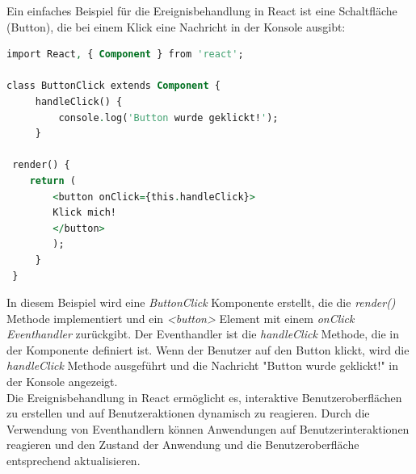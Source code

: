 Ein einfaches Beispiel für die Ereignisbehandlung in React ist eine Schaltfläche (Button), die bei einem Klick eine Nachricht in der Konsole ausgibt:

\begin{lstlisting}[language=vhdl,
	frame=single,           % Ein Rahmen um den Code
	framexleftmargin=15pt,  % Rahmen link von den Zahlen
	style=algoBericht,
	label={Events},
	captionpos=b ,          % Caption unter den Code setzen
	caption={Beispiel EventHandler}]
import React, { Component } from 'react';

class ButtonClick extends Component {
     handleClick() {
         console.log('Button wurde geklickt!');
     }
 
 render() {
 	return (
 	    <button onClick={this.handleClick}>
 	    Klick mich!
 	    </button>
 	    );
     }
 }

\end{lstlisting}

In diesem Beispiel wird eine \emph{ButtonClick} Komponente erstellt, die die \emph{render()} Methode implementiert und ein \emph{<button>} Element mit einem \emph{onClick Eventhandler} zurückgibt. Der Eventhandler ist die \emph{handleClick} Methode, die in der Komponente definiert ist. Wenn der Benutzer auf den Button klickt, wird die \emph{handleClick} Methode ausgeführt und die Nachricht "Button wurde geklickt!" in der Konsole angezeigt.\cite{react_de_handling_events}\\

Die Ereignisbehandlung in React ermöglicht es, interaktive Benutzeroberflächen zu erstellen und auf Benutzeraktionen dynamisch zu reagieren. Durch die Verwendung von Eventhandlern können Anwendungen auf Benutzerinteraktionen reagieren und den Zustand der Anwendung und die Benutzeroberfläche entsprechend aktualisieren.

